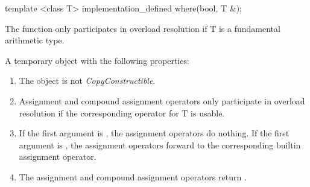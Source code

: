 \begin{itemdecl}
template <class T> implementation_defined where(bool, T &);
\end{itemdecl}
\begin{itemdescr}
  \pnum\remarks The function only participates in overload resolution if \type T is a fundamental arithmetic type.

  \pnum\returns A temporary object with the following properties:
  \begin{enumerate}
    \item The object is not \textit{CopyConstructible}.
    \item Assignment and compound assignment operators only participate in overload resolution if the corresponding operator for \type T is usable.
    \item \effects If the first argument is \false, the assignment operators do nothing.
      If the first argument is \true, the assignment operators forward to the corresponding builtin assignment operator.
    \item The assignment and compound assignment operators return \void.
  \end{enumerate}
\end{itemdescr}
